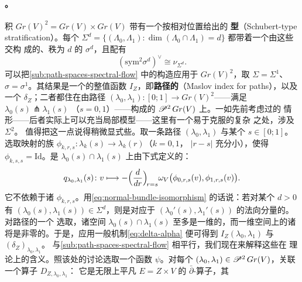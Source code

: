 \paragraph{\trArnoldStratification。}\label{sub:arnold-stratification}
积 $Gr(V)^2=Gr(V)\times Gr(V)$ 带有一个按相对位置给出的%
\textbf{\trSchubert{}型\trStratum}（Schubert-type stratification）。每个\trStratum{}
$\Sigma^d=\{(\Lambda_0,\Lambda_1):\dim(\Lambda_0\cap\Lambda_1)=d\}$ 都带着一个由这些交构
成的、秩为 $d$ 的\trVectorBundle{} $\sigma^d$，且配有\trCanonical{}\trIsomorphism{}
\begin{equation}\label{eq:normal-bundle-isomorphism}
(\mathrm{sym}^2\sigma^d)^\vee\cong\nu_{\Sigma^d}.
\end{equation}
可以把\cref{sub:path-spaces-spectral-flow} 中的\trPathSpace{}构造应用于 $Gr(V)^2$，取
$\Sigma=\Sigma^1$、$\sigma=\sigma^1$。其结果是一个\trLocallyConstant{}的整值函数
$I_Z$，即\textbf{路径的\trMaslovIndex}（Maslov index for paths），以及一个%
\trRealLineBundle{} $\delta_Z$；二者都住在由路径
$(\lambda_0,\lambda_1)\colon[0;1]\to Gr(V)^2$——满足 $\lambda_0(s)\pitchfork\lambda_1(s)$
（$s=0,1$）——构成的\trPathSpace{} $\mathscr{P}^2\,Gr(V)$ 上。一如先前考虑过的%
\trQuadraticForm{}情形——后者实际上可以充当局部模型——这里有一个易于克服的复杂
之处，涉及 $\Sigma^2$。
值得把这一点说得稍微显式些。取一条路径 $(\lambda_0,\lambda_1)$ 与某个 $s\in[0;1]$。
选取\trLinear{}映射的族 $\phi_{k,r,s}\colon\lambda_k(s)\to\lambda_k(r)$（$k=0,1$，
$|r-s|$ 充分小），使得 $\phi_{k,s,s}=\mathrm{Id}$。\trCrossingForm{}是
$\lambda_0(s)\cap\lambda_1(s)$ 上由下式定义的\trQuadraticForm：
\begin{equation*}
q_{\lambda_0,\lambda_1}(s)\colon v\longmapsto
-\Bigl(\frac{d}{dr}\Bigr)_{\!r=s}\omega_V\bigl(\phi_{0,r,s}(v),\phi_{1,r,s}(v)\bigr).
\end{equation*}
它不依赖于诸 $\phi_{k,r,s}$。用\eqref{eq:normal-bundle-isomorphism} 的话说：若对某个
$d>0$ 有 $(\lambda_0(s),\lambda_1(s))\in\Sigma^d$，则\trCrossingForm{}是对应于
$(\lambda_0'(s),\lambda_1'(s))$ 的法向分量的\trQuadraticForm。对路径的一个\trGeneric{}
选取，诸空间 $\lambda_0(s)\cap\lambda_1(s)$ 至多是一维的，而一维空间上的诸%
\trCrossingForm{}将是非零的。于是，应用一般机制\eqref{eq:delta-alpha} 便可得到
$I_Z(\lambda_0,\lambda_1)$ 与 $(\delta_Z)_{\lambda_0,\lambda_1}$。
与\cref{sub:path-spaces-spectral-flow} 相平行，我们现在来解释这些\trInvariant{}在%
\trIndex{}理论上的含义。照该处的讨论选取一个函数 $\psi$。对每个
$(\lambda_0,\lambda_1)\in\mathscr{P}^2\,Gr(V)$，关联一个算子 $D_{Z,\lambda_0,\lambda_1}$：
它是无限\trStrip{}上平凡\trVectorBundle{} $E=Z\times V$ 的 $\bar\partial$-算子，其%
